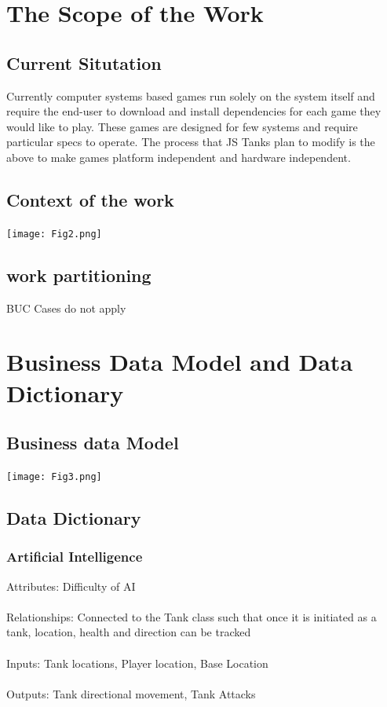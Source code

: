 \documentclass{article}
\begin{document}
\section{The Scope of the Work} 
 \subsection{Current Situtation}
 Currently
computer systems based games run solely on the system itself and  require the
end-user to download and install dependencies for each game they would like to
play. These games are designed for few systems and require particular specs to
operate. The process that JS Tanks plan to modify is the above to make games
platform independent and hardware independent.

\subsection{Context of the work}
\texttt{[image: Fig2.png]}
\subsection{work partitioning}
BUC Cases do not apply
\section{Business Data Model and Data Dictionary}
\subsection{Business data Model}
\texttt{[image: Fig3.png]}
\subsection{Data Dictionary}
\subsubsection{Artificial Intelligence}
Attributes: Difficulty of AI
\\\\Relationships:  Connected to the Tank class such that once it is initiated 
as a tank, location, health and direction can be tracked
\\\\Inputs: Tank locations, Player location, Base Location
\\\\Outputs: Tank directional movement, Tank Attacks
\end{document}
